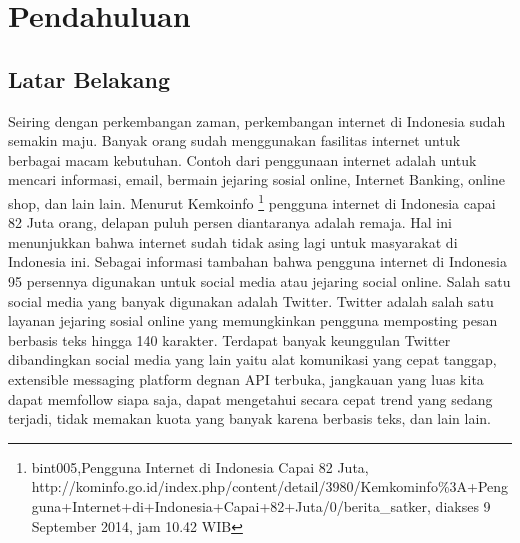 \chapter{Pendahuluan}
\label{chap:pendahuluan}

\section{Latar Belakang}
\label{sec:latar belakang}

Seiring dengan perkembangan zaman, perkembangan internet di Indonesia sudah semakin maju.  Banyak orang sudah menggunakan fasilitas internet untuk berbagai macam kebutuhan. Contoh dari penggunaan internet adalah untuk mencari informasi, email, bermain jejaring sosial online, Internet Banking, online shop, dan lain lain. Menurut Kemkoinfo \footnote{bint005,Pengguna Internet di Indonesia Capai 82 Juta, http://kominfo.go.id/index.php/content/detail/3980/Kemkominfo\%3A+Pengguna+Internet+di+Indonesia+Capai+82+Juta/0/berita_satker, diakses 9 September 2014, jam 10.42 WIB} pengguna internet di Indonesia capai 82 Juta orang, delapan puluh persen diantaranya adalah remaja. Hal ini menunjukkan bahwa internet sudah tidak asing lagi untuk masyarakat di Indonesia ini. Sebagai informasi tambahan bahwa pengguna internet di Indonesia 95 persennya digunakan untuk social media atau jejaring social online. Salah satu social media yang banyak digunakan adalah Twitter. Twitter adalah salah satu layanan jejaring sosial online yang memungkinkan pengguna memposting pesan berbasis teks hingga 140 karakter. Terdapat banyak keunggulan Twitter dibandingkan social media yang lain yaitu alat komunikasi yang cepat tanggap, extensible messaging platform degnan API terbuka, jangkauan yang luas kita dapat memfollow siapa saja, dapat mengetahui secara cepat trend yang sedang terjadi, tidak memakan kuota yang banyak karena berbasis teks, dan lain lain. 


